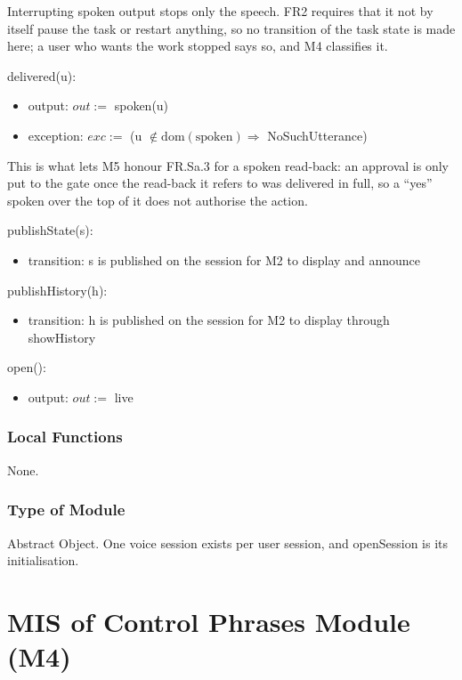 \documentclass[12pt, titlepage]{article}
\begin{document}
\noindent Interrupting spoken output stops only the speech. FR2 requires that it
not by itself pause the task or restart anything, so no transition of the task
state is made here; a user who wants the work stopped says so, and M4 classifies
it.

\noindent delivered(u):
\begin{itemize}
\item output: $out :=$ spoken(u)
\item exception: $exc :=$ (u $\notin \mathrm{dom}(\text{spoken}) \Rightarrow$
NoSuchUtterance)
\end{itemize}

\noindent This is what lets M5 honour FR.Sa.3 for a spoken read-back: an
approval is only put to the gate once the read-back it refers to was delivered
in full, so a ``yes'' spoken over the top of it does not authorise the action.

\noindent publishState(s):
\begin{itemize}
\item transition: s is published on the session for M2 to display and announce
\end{itemize}

\noindent publishHistory(h):
\begin{itemize}
\item transition: h is published on the session for M2 to display through
showHistory
\end{itemize}

\noindent open():
\begin{itemize}
\item output: $out :=$ live
\end{itemize}

\subsubsection{Local Functions}

None.

\subsubsection{Type of Module}

Abstract Object. One voice session exists per user session, and openSession is
its initialisation.

\newpage

\section{MIS of Control Phrases Module (M4)} \label{mod:phrases}
\end{document}
